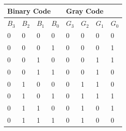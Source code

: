 \documentclass[11pt]{article}
\begin{document}
\begin{table}[H]
	\begin{tabular}{|llll||llll|}
		\hline
		\multicolumn{4}{|l|}{\textbf{Binary Code}} & \multicolumn{4}{l|}{\textbf{Gray Code}}                                                                                                                                     \\ \hline
		\multicolumn{1}{|l|}{$B_3$}                & \multicolumn{1}{l|}{$B_2$}              & \multicolumn{1}{l|}{$B_1$} & $B_0$ & \multicolumn{1}{l|}{$G_3$} & \multicolumn{1}{l|}{$G_2$} & \multicolumn{1}{l|}{$G_1$} & $G_0$ \\ \hline
		\multicolumn{1}{|l|}{0}                    & \multicolumn{1}{l|}{0}                  & \multicolumn{1}{l|}{0}     & 0     & \multicolumn{1}{l|}{0}     & \multicolumn{1}{l|}{0}     & \multicolumn{1}{l|}{0}     & 0     \\ \hline
		\multicolumn{1}{|l|}{0}                    & \multicolumn{1}{l|}{0}                  & \multicolumn{1}{l|}{0}     & 1     & \multicolumn{1}{l|}{0}     & \multicolumn{1}{l|}{0}     & \multicolumn{1}{l|}{0}     & 1     \\ \hline
		\multicolumn{1}{|l|}{0}                    & \multicolumn{1}{l|}{0}                  & \multicolumn{1}{l|}{1}     & 0     & \multicolumn{1}{l|}{0}     & \multicolumn{1}{l|}{0}     & \multicolumn{1}{l|}{1}     & 1     \\ \hline
		\multicolumn{1}{|l|}{0}                    & \multicolumn{1}{l|}{0}                  & \multicolumn{1}{l|}{1}     & 1     & \multicolumn{1}{l|}{0}     & \multicolumn{1}{l|}{0}     & \multicolumn{1}{l|}{1}     & 0     \\ \hline
		\multicolumn{1}{|l|}{0}                    & \multicolumn{1}{l|}{1}                  & \multicolumn{1}{l|}{0}     & 0     & \multicolumn{1}{l|}{0}     & \multicolumn{1}{l|}{1}     & \multicolumn{1}{l|}{1}     & 0     \\ \hline
		\multicolumn{1}{|l|}{0}                    & \multicolumn{1}{l|}{1}                  & \multicolumn{1}{l|}{0}     & 1     & \multicolumn{1}{l|}{0}     & \multicolumn{1}{l|}{1}     & \multicolumn{1}{l|}{1}     & 1     \\ \hline
		\multicolumn{1}{|l|}{0}                    & \multicolumn{1}{l|}{1}                  & \multicolumn{1}{l|}{1}     & 0     & \multicolumn{1}{l|}{0}     & \multicolumn{1}{l|}{1}     & \multicolumn{1}{l|}{0}     & 1     \\ \hline
		\multicolumn{1}{|l|}{0}                    & \multicolumn{1}{l|}{1}                  & \multicolumn{1}{l|}{1}     & 1     & \multicolumn{1}{l|}{0}     & \multicolumn{1}{l|}{1}     & \multicolumn{1}{l|}{0}     & 0     \\ \hline

\end{tabular}
\end{table}
\end{document}
